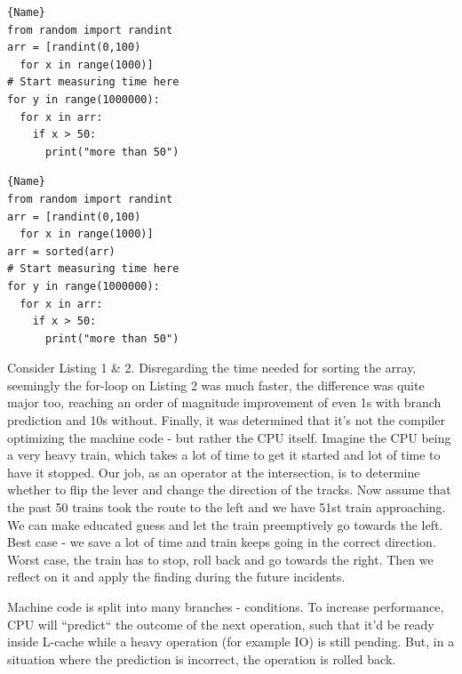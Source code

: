 \documentclass{article}
\begin{document}
\noindent\begin{minipage}{.45\textwidth}
\begin{lstlisting}[caption=Operation on an unsorted array,frame=tlrb]{Name}
from random import randint
arr = [randint(0,100) 
  for x in range(1000)]
# Start measuring time here
for y in range(1000000):
  for x in arr:
    if x > 50:
      print("more than 50")
\end{lstlisting}
\end{minipage}\hfill
\begin{minipage}{.45\textwidth}
\begin{lstlisting}[caption=Operation on a sorted array,frame=tlrb]{Name}
from random import randint
arr = [randint(0,100) 
  for x in range(1000)]
arr = sorted(arr)
# Start measuring time here
for y in range(1000000):
  for x in arr:
    if x > 50:
      print("more than 50")
\end{lstlisting}
\end{minipage}

Consider Listing 1 \& 2. Disregarding the time needed for sorting the array, seemingly the for-loop on Listing 2 was much faster, the difference was quite major too, reaching an order of magnitude improvement of even 1s with branch prediction and 10s without. Finally, it was determined that it's not the compiler optimizing the machine code - but rather the CPU itself. Imagine the CPU being a very heavy train, which takes a lot of time to get it started and lot of time to have it stopped. Our job, as an operator at the intersection, is to determine whether to flip the lever and change the direction of the tracks. Now assume that the past 50 trains took the route to the left and we have 51st train approaching. We can make educated guess and let the train preemptively go towards the left. Best case - we save a lot of time and train keeps going in the correct direction. Worst case, the train has to stop, roll back and go towards the right. Then we reflect on it and apply the finding during the future incidents.

Machine code is split into many branches - conditions. To increase performance, CPU will ``predict`` the outcome of the next operation, such that it'd be ready inside L-cache while a heavy operation (for example IO) is still pending. But, in a situation where the prediction is incorrect, the operation is rolled back. 
\end{document}
